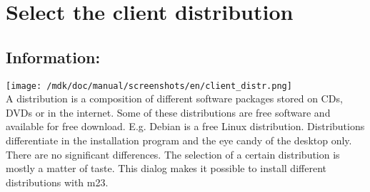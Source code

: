 \section{Select the client distribution}\subsection{Information:}
\texttt{[image: /mdk/doc/manual/screenshots/en/client\_distr.png]} \\
A distribution is a composition of different software packages stored on CDs, DVDs or in the internet. Some of these distributions are free software and available for free download. E.g. Debian is a free Linux distribution. Distributions differentiate in the installation program and the eye candy of the desktop only. There are no significant differences. The selection of a certain distribution is mostly a matter of taste. This dialog makes it possible to install different distributions with m23.\\
